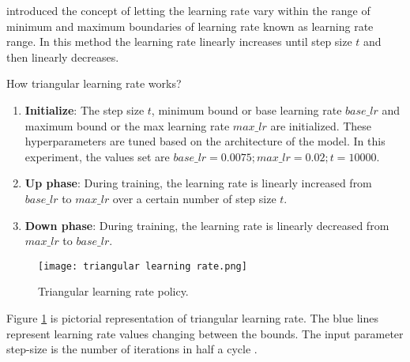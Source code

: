 \parencite{Smith.03062015} introduced the concept of letting the learning rate vary within the range of minimum and maximum boundaries of learning rate known as learning rate range. In this method the learning rate linearly increases until step size $ t $ and then linearly decreases. 


How triangular learning rate works?
\begin{enumerate}
    \item \textbf{Initialize}: The step size $ t $, minimum bound or base learning rate $ base\_lr$ and maximum bound or the max learning rate  $max\_lr$ are initialized. These hyperparameters are tuned based on the architecture of the model. In this experiment, the values set are  $ base\_lr=0.0075 ; max\_lr=0.02; t=10000$.
    \item  \textbf{Up phase}: During training, the learning rate is linearly increased from $ base\_lr$ to $max\_lr$ over a certain number of step size $ t $.
    \item \textbf{Down phase}: During training, the learning rate is linearly decreased from $max\_lr$ to $base\_lr$.
\end{enumerate}

\begin{figure}[H]
    \centering    
    \texttt{[image: triangular learning rate.png]}
    \caption{Triangular learning rate policy.  \parencite{Smith.03062015}
    }
    \label{fig:trl}
\end{figure}
 Figure \ref{fig:trl} is pictorial representation of triangular learning rate. The blue lines represent learning rate values changing between the bounds. The input parameter step-size is the number of iterations in half a cycle \parencite{Smith.03062015}.

